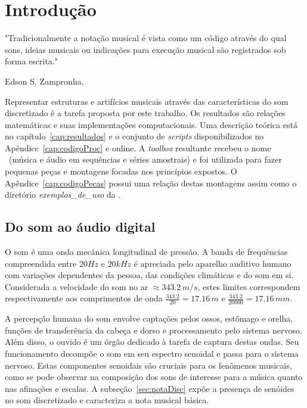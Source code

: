 \setcounter{page}{23}
\chapter{Introdução} %
\label{cap:intro} 
\epigraph{"Tradicionalmente a notação musical é vista como um código através do qual sons, ideias musicais ou indicações para execução musical são registrados sob forma escrita."}{Edson S. Zampronha.\cite{Zampronha} \\}


Representar estruturas e artifícios musicais através das características do som discretizado
é a tarefa proposta por este trabalho. Os resultados são relações matemáticas e suas implementações computacionais. Uma descrição teórica está no capítulo~\ref{cap:resultados} e o conjunto de \emph{scripts} disponibilizados no Apêndice~\ref{cap:codigoProc} e online.\cite{MASSA} A \emph{toolbox} resultante recebeu o nome \massa\ (música e áudio em sequências e séries amostrais) e foi utilizada para fazer pequenas peças e montagens focadas nos princípios expostos. O Apêndice~\ref{cap:codigoPecas} possui uma relação destas montagens assim como o diretório \emph{exemplos\_de\_uso} da \massa.

    \section{Do som ao áudio digital}\label{sec:audio}

O som é uma onda mecânica longitudinal de pressão. A banda de frequências compreendida entre $20Hz$ e $20 kHz$ é apreciada pelo aparelho auditivo humano com variações dependentes da pessoa, das condições climáticas e do som em si.
 Considerada a velocidade do som no ar $\approx 343.2\,m/s$,
estes limites correspondem respectivamente aos comprimentos de onda $\frac{343.2}{20} = 17.16\,m$ e $\frac{343.2}{20000}=17.16\,mm$.\cite{Roederer}


A percepção humana do som envolve captações pelos ossos, estômago e orelha, funções de transferência da cabeça e dorso e processamento pelo sistema nervoso. Além disso, o ouvido é um órgão dedicado à tarefa de captura destas ondas. Seu funcionamento decompõe o som em seu espectro senoidal e passa para o sistema nervoso.\cite{Roederer} Estas componentes senoidais são cruciais para os fenômenos musicais, como se pode observar na composição dos sons de interesse para a música quanto nas afinações e escalas.\cite{floEsp} A subseção~\ref{sec:notaDisc} expõe a presença de senóides no som discretizado e caracteriza a nota musical básica.

